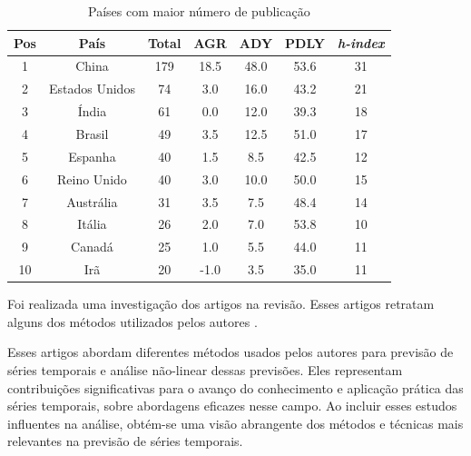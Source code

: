 \begin{table}[H]
	\centering
	\caption{Países com maior número de publicação}\label{tb:pais}
	\begin{tabular}{ccccccc}
		\toprule
		Pos & País & Total & AGR & ADY & PDLY & \textit{h-index} \\
		\midrule
		1 & China & 179 & 18.5 & 48.0 & 53.6 & 31 \\
		2 & Estados Unidos & 74 & 3.0 & 16.0 & 43.2 & 21 \\
		3 & Índia & 61 & 0.0 & 12.0 & 39.3 & 18 \\
		4 & Brasil & 49 & 3.5 & 12.5 & 51.0 & 17 \\
		5 & Espanha & 40 & 1.5 & 8.5 & 42.5 & 12 \\
		6 & Reino Unido & 40 & 3.0 & 10.0 & 50.0 & 15 \\
		7 & Austrália & 31 & 3.5 & 7.5 & 48.4 & 14 \\
		8 & Itália & 26 & 2.0 & 7.0 & 53.8 & 10 \\
		9 & Canadá & 25 & 1.0 & 5.5 & 44.0 & 11 \\
		10 & Irã & 20 & -1.0 & 3.5 & 35.0 & 11 \\
		\bottomrule
	\end{tabular}
	
\end{table}



Foi realizada uma investigação dos artigos na revisão. Esses artigos retratam alguns dos métodos utilizados pelos autores .

Esses artigos abordam diferentes métodos usados pelos autores para previsão de séries temporais e análise não-linear dessas previsões. Eles representam contribuições significativas para o avanço do conhecimento e aplicação prática das séries temporais, sobre abordagens eficazes nesse campo. Ao incluir esses estudos influentes na análise, obtém-se uma visão abrangente dos métodos e técnicas mais relevantes na previsão de séries temporais.

